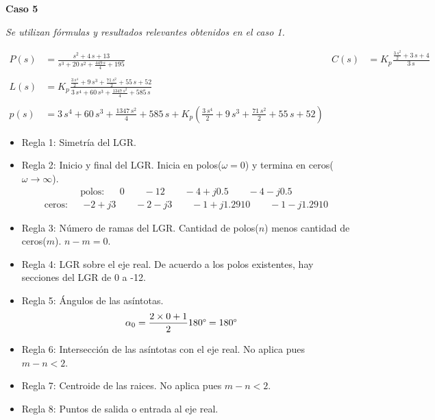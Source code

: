 \textbf{Caso 5}

\textit{Se utilizan fórmulas y resultados relevantes obtenidos en el caso 1.}

\begin{align*}
  P(s) &= 
  \frac{s^2+4\,s+13}{s^3+20\,s^2+\frac{449\,s}{4}+195}
  &
  C(s) &= K_p
  \frac{\frac{3\,s^2}{2}+3\,s+4}{3\,s}
  \\\\
  L(s) &= K_p
  \frac{\frac{3\,s^4}{2}+9\,s^3+\frac{71\,s^2}{2}+55\,s+52}{3\,s^4+60\,s^3+\frac{1347\,s^2}{4}+585\,s}
  \\\\
  p(s) &= 
  3\,s^4+60\,s^3+\frac{1347\,s^2}{4}+585\,s + K_p(\frac{3\,s^4}{2}+9\,s^3+\frac{71\,s^2}{2}+55\,s+52)
\end{align*}
\begin{itemize}
  \item Regla 1: Simetría del LGR.
  \item Regla 2: Inicio y final del LGR. Inicia en polos($\omega = 0$) y termina en ceros($\omega \rightarrow \infty$).
  \begin{align*}
    \text{polos:} && 0 \qquad  -12 \qquad  -4 + j0.5 \qquad  -4 - j0.5
  \end{align*}
  \begin{align*}
    \text{ceros:} && -2 + j3 \qquad -2 - j3 \qquad -1 + j1.2910 \qquad -1 - j1.2910
  \end{align*}

  \item Regla 3: Número de ramas del LGR. Cantidad de polos($n$) menos cantidad de ceros($m$). $n-m = 0$.
  \item Regla 4: LGR sobre el eje real. 
  De acuerdo a los polos existentes, hay secciones del LGR de 0 a -12.
  \item Regla 5: Ángulos de las asíntotas.
  \begin{align*}
    \alpha_0 &= \frac{2\times0 + 1}{2}  180\degree  = 180\degree
  \end{align*}
  \item Regla 6: Intersección de las asíntotas con el eje real. No aplica pues $m-n<2$.
  \item Regla 7: Centroide de las raices. No aplica pues $m-n<2$.
  \item Regla 8: Puntos de salida o entrada al eje real.


\end{itemize}
